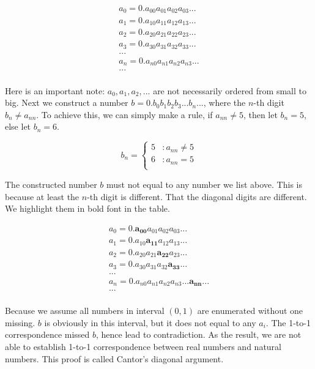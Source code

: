 \documentclass{article}
\begin{document}
\[
\begin{array}{l}
a_0 = 0.a_{00}a_{01}a_{02}a_{03}...\\
a_1 = 0.a_{10}a_{11}a_{12}a_{13}...\\
a_2 = 0.a_{20}a_{21}a_{22}a_{23}...\\
a_3 = 0.a_{30}a_{31}a_{32}a_{33}...\\
... \\
a_n = 0.a_{n0}a_{n1}a_{n2}a_{n3}...\\
... \\
\end{array}
\]

Here is an important note: $a_0, a_1, a_2, ...$ are not necessarily ordered from small to big. Next we construct a number $b = 0.b_0b_1b_2b_3...b_n...$, where the $n$-th digit $b_n \neq a_{nn}$. To achieve this, we can simply make a rule, if $a_{nn} \neq 5$, then let $b_n = 5$, else let $b_n = 6$.

\[
b_n = \begin{cases}
5 & : a_{nn} \neq 5 \\
6 & : a_{nn} = 5 \\
\end{cases}
\]

The constructed number $b$ must not equal to any number we list above. This is because at least the $n$-th digit is different. That the diagonal digits are different. We highlight them in bold font in the table.

\[
\begin{array}{l}
a_0 = 0.\pmb{a_{00}}a_{01}a_{02}a_{03}...\\
a_1 = 0.a_{10}\pmb{a_{11}}a_{12}a_{13}...\\
a_2 = 0.a_{20}a_{21}\pmb{a_{22}}a_{23}...\\
a_3 = 0.a_{30}a_{31}a_{32}\pmb{a_{33}}...\\
... \\
a_n = 0.a_{n0}a_{n1}a_{n2}a_{n3}...\pmb{a_{nn}}...\\
... \\
\end{array}
\]

Because we assume all numbers in interval $(0, 1)$ are enumerated without one missing. $b$ is obviously in this interval, but it does not equal to any $a_i$. The 1-to-1 correspondence missed $b$, hence lead to contradiction. As the result, we are not able to establish 1-to-1 correspondence between real numbers and natural numbers. This proof is called Cantor's diagonal argument.
\end{document}
